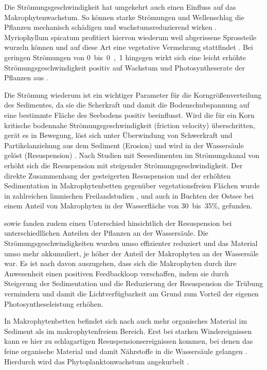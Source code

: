 Die Strömungsgeschwindigkeit hat umgekehrt auch einen Einfluss auf das Makrophytenwachstum. So können starke Strömungen und Wellenschlag die Pflanzen mechanisch schädigen und wachstumsreduzierend wirken \citep{biggs_1996}. Myriophyllum spicatum profitiert hiervon wiederum weil abgerissene Sprossteile wurzeln können und auf diese Art eine vegetative Vermehrung stattfindet \citep{madsen_1997}. Bei geringen Strömungen von \unit{0 bis 0,1}{\metre\per\second} hingegen wirkt sich eine leicht erhöhte Strömungsgeschwindigkeit positiv auf Wachstum und Photosyntheserate der Pflanzen aus \citep{madsen_1983}.

Die Strömung wiederum ist ein wichtiger Parameter für die Korngrößenverteilung des Sedimentes, da sie die Scherkraft und damit die Bodenschubspannung auf eine bestimmte Fläche des Seebodens positiv beeinflusst. Wird die für ein Korn kritische bodennahe Strömungsgeschwindigkeit (friction velocity) überschritten, gerät es in Bewegung, löst sich unter Überwindung von Schwerkraft und Partikelanziehung aus dem Sediment (Erosion) und wird in der Wassersäule gelöst (Resuspension) \citep{madsen_2001}. Nach Studien mit Seesedimenten im Strömungskanal von \cite{hu_2011} erhöht sich die Resuspension mit steigender Strömungsgeschwindigkeit. 
Der direkte Zusammenhang der gesteigerten Resuspension und der erhöhten Sedimentation in Makrophytenbetten gegenüber vegetationsfreien Flächen wurde in zahlreichen limnischen Freilandstudien \citep{horppila_2003, horppila_2005}, und auch in Buchten der Ostsee \citep{kaitaranta_2013} bei einem Anteil von Makrophyten in der Wasserfläche von \unit{30 bis 35}{\%}, gefunden.

\cite{ward_1984} sowie \cite{fonseca_1986} fanden zudem einen Unterschied hinsichtlich der Resuspension bei unterschiedllichen Anteilen der Pflanzen an der Wassersäule. Die Strömungsgeschwindigkeiten wurden umso effizienter reduziert und das Material umso mehr akkumuliert, je höher der Anteil der Makrophyten an der Wassersäle war. Es ist nach \cite{madsen_2001} davon auszugehen, dass sich die Makrophyten durch ihre Anwesenheit einen positiven Feedbackloop verschaffen, indem sie durch Steigerung der Sedimentation und die Reduzierung der Resuspension die Trübung vermindern und damit die Lichtverfügbarkeit am Grund zum Vorteil der eigenen Photosyntheseleistung erhöhen.

In Makrophytenbetten befindet sich nach \cite{kenworthy_1982} auch mehr organisches Material im Sediment als im makrophytenfreiem Bereich. Erst bei starken Windereignissen kann es hier zu schlagartigen Resuspensionsereignissen kommen, bei denen das feine organische Material und damit Nährstoffe in die Wassersäule gelangen \citep{dauby_1995}. Hierdurch wird das Phytoplanktonwachstum angekurbelt \citep{cowan_1996}.

